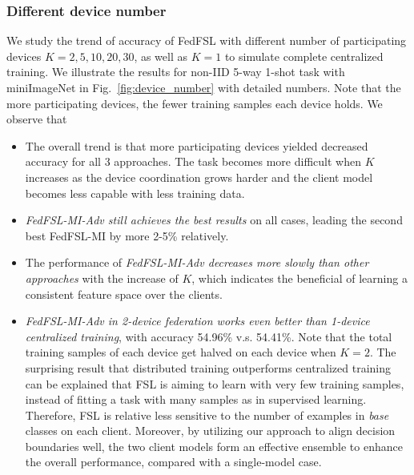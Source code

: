 \subsubsection{Different device number}
We study the trend of accuracy of FedFSL with different number of participating devices $K=2,5,10,20,30$, as well as $K=1$ to simulate complete centralized training.
We illustrate the results for non-IID 5-way 1-shot task with miniImageNet  in Fig.~\ref{fig:device_number} with detailed numbers.
Note that the more participating devices, the fewer training samples each device holds.
We observe that
\begin{itemize}[leftmargin=*]
\item The overall trend is that more participating devices yielded decreased accuracy for all 3 approaches. The task becomes more difficult when $K$ increases as the device coordination grows harder and the client model becomes less capable with less training data.
\item \emph{FedFSL-MI-Adv still achieves the best results} on all cases, leading the second best FedFSL-MI by more 2-5\% relatively.
\item The performance of \emph{FedFSL-MI-Adv decreases more slowly than other approaches} with the increase of $K$, which indicates the beneficial of learning a consistent feature space over the clients.
\item \emph{FedFSL-MI-Adv in 2-device federation works even better than 1-device centralized training}, with accuracy 54.96\% v.s. 54.41\%. Note that the total training samples of each device get halved on each device when $K=2$. The surprising result that distributed training outperforms centralized training can be explained that FSL is aiming to learn with very few training samples, instead of fitting a task with many samples as in supervised learning. Therefore, FSL is relative less sensitive to the number of examples in \emph{base} classes on each client. Moreover, by utilizing our approach to align decision boundaries well, the two client models form an effective ensemble to enhance the overall performance, compared with a single-model case.
\end{itemize}


